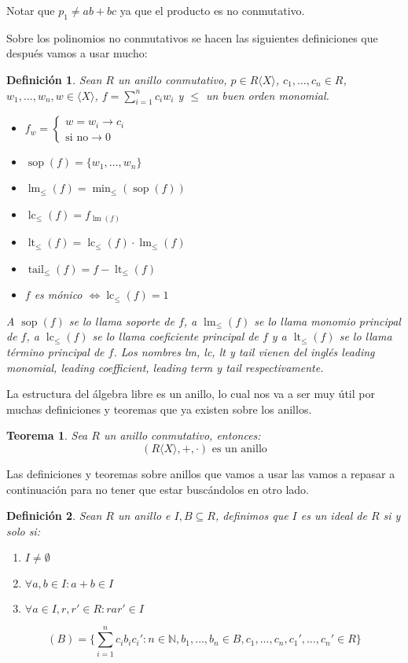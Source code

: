 \documentclass{report}
\theoremstyle{customstyle}
\newtheorem{definition}{Definición}[chapter]
\newtheorem{theorem}{Teorema}[chapter]
\theoremstyle{factstyle}
\DeclareMathOperator{\sop}{sop}
\DeclareMathOperator{\lm}{lm}
\DeclareMathOperator{\lc}{lc}
\DeclareMathOperator{\lt}{lt}
\DeclareMathOperator{\tail}{tail}
\begin{document}
Notar que $p_1 ≠ ab + bc$ ya que el producto es no conmutativo.

Sobre los polinomios no conmutativos se hacen las siguientes definiciones que después vamos a usar mucho:

\begin{definition}\label{def:cosas de polinomios}
  Sean $R$ un anillo conmutativo, $p ∈ R⟨X⟩$, $c_1, …, c_n ∈ R$, $w_1, …, w_n, w ∈ ⟨X⟩$, $f = ∑_{i = 1}^n c_i w_i$ y $≤$ un buen orden monomial.
  \begin{itemize}
    \item $f_w = \left\{\begin{array}{ll} w = w_i → c_i \\ \text{si no} → 0  \end{array} \right.$
    \item $\sop(f) = \{w_1, …, w_n\}$
    \item $\lm_≤(f) = \min_≤(\sop(f))$
    \item $\lc_≤(f) = f_{\lm(f)}$
    \item $\lt_≤(f) = \lc_≤(f) · \lm_≤(f)$
    \item $\tail_≤(f) = f - \lt_≤(f)$
    \item $f$ es mónico $⇔ \lc_≤(f) = 1$
  \end{itemize}

  A $\sop(f)$ se lo llama soporte de $f$, a $\lm_≤(f)$ se lo llama monomio principal de $f$, a $\lc_≤(f)$ se lo llama coeficiente principal de $f$ y a $\lt_≤(f)$ se lo llama término principal de $f$. Los nombres lm, lc, lt y tail vienen del inglés leading monomial, leading coefficient, leading term y tail respectivamente.
\end{definition}

La estructura del álgebra libre es un anillo, lo cual nos va a ser muy útil por muchas definiciones y teoremas que ya existen sobre los anillos.

\begin{theorem}
  Sea $R$ un anillo conmutativo, entonces:
  \[ (R⟨X⟩, +, ·)\text{ es un anillo} \]
\end{theorem}

Las definiciones y teoremas sobre anillos que vamos a usar las vamos a repasar a continuación para no tener que estar buscándolos en otro lado.

\begin{definition}\label{def:ideal}
  Sean $R$ un anillo e $I, B ⊆ R$, definimos que $I$ es un ideal de $R$ si y solo si:
  \begin{enumerate}
    \item $I ≠ ∅$
    \item $∀a, b ∈ I : a + b ∈ I$
    \item $∀a ∈ I, r, r' ∈ R : r a r' ∈ I$
  \end{enumerate}
  \[ (B) = \{∑_{i = 1}^n c_i b_i c_i' : n ∈ ℕ, b_1, …, b_n ∈ B, c_1, …, c_n, c_1', …, c_n' ∈ R\} \]
\end{definition}
\end{document}
